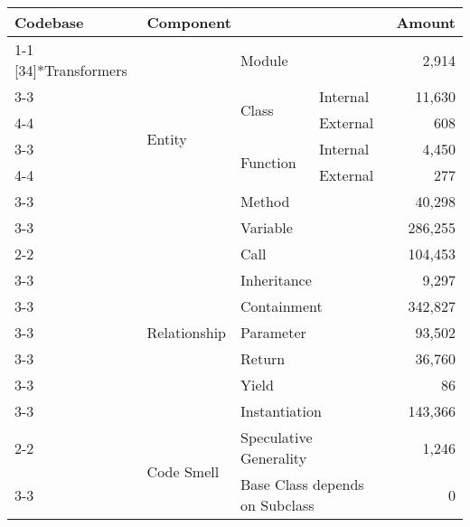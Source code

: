 \begin{tabularx}{\linewidth}{p{1.8cm}p{1.8cm}Xp{0.8cm}r}
\toprule
\textbf{Codebase} & \multicolumn{3}{l}{\textbf{Component}} & \textbf{Amount} \\
\cmidrule{1-1}\cmidrule{2-2}\cmidrule{3-3}\cmidrule{4-4}\cmidrule{5-5}
\multirow{17}[34]{*}{Transformers} & \multirow{7}[14]{*}{Entity} & \multicolumn{2}{l}{Module} & 2,914 \\
\cmidrule{3-3}\cmidrule{4-4}\cmidrule{5-5}
 &  & \multirow{2}[4]{*}{Class} & Internal & 11,630 \\
\cmidrule{4-4}\cmidrule{5-5}
 &  &  & External & 608 \\
\cmidrule{3-3}\cmidrule{4-4}\cmidrule{5-5}
 &  & \multirow{2}[4]{*}{Function} & Internal & 4,450 \\
\cmidrule{4-4}\cmidrule{5-5}
 &  &  & External & 277 \\
\cmidrule{3-3}\cmidrule{4-4}\cmidrule{5-5}
 &  & \multicolumn{2}{l}{Method} & 40,298 \\
\cmidrule{3-3}\cmidrule{4-4}\cmidrule{5-5}
 &  & \multicolumn{2}{l}{Variable} & 286,255 \\
\cmidrule{2-2}\cmidrule{3-3}\cmidrule{4-4}\cmidrule{5-5}
 & \multirow{7}[14]{*}{Relationship} & \multicolumn{2}{l}{Call} & 104,453 \\
\cmidrule{3-3}\cmidrule{4-4}\cmidrule{5-5}
 &  & \multicolumn{2}{l}{Inheritance} & 9,297 \\
\cmidrule{3-3}\cmidrule{4-4}\cmidrule{5-5}
 &  & \multicolumn{2}{l}{Containment} & 342,827 \\
\cmidrule{3-3}\cmidrule{4-4}\cmidrule{5-5}
 &  & \multicolumn{2}{l}{Parameter} & 93,502 \\
\cmidrule{3-3}\cmidrule{4-4}\cmidrule{5-5}
 &  & \multicolumn{2}{l}{Return} & 36,760 \\
\cmidrule{3-3}\cmidrule{4-4}\cmidrule{5-5}
 &  & \multicolumn{2}{l}{Yield} & 86 \\
\cmidrule{3-3}\cmidrule{4-4}\cmidrule{5-5}
 &  & \multicolumn{2}{l}{Instantiation} & 143,366 \\
\cmidrule{2-2}\cmidrule{3-3}\cmidrule{4-4}\cmidrule{5-5}
 & \multirow{3}[6]{*}{Code Smell} & \multicolumn{2}{l}{\begin{minipage}[t]{2.2cm}Speculative \newline Generality\end{minipage}} & 1,246 \\
\cmidrule{3-3}\cmidrule{4-4}\cmidrule{5-5}
 &  & \multicolumn{2}{l}{\begin{minipage}[t]{2.2cm}Base Class depends on Subclass\end{minipage}} & 0 \\

\end{tabularx}

